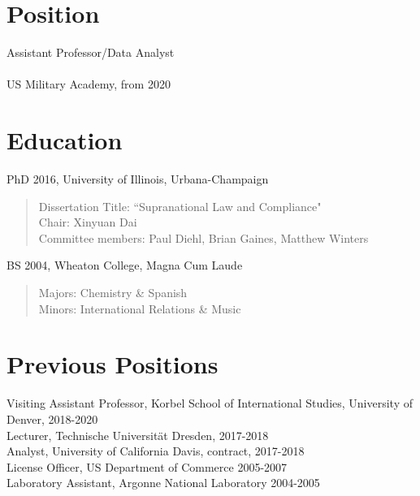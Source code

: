 \documentclass[margin, 10pt]{CVStyleTemplate}\usepackage[]{graphicx}\usepackage[]{color}
\begin{document}
\begin{resume}

\section{Position}

Assistant Professor/Data Analyst \\
\\
US Military Academy, from 2020 \\


\section{Education}
PhD 2016, University of Illinois, Urbana-Champaign 
  \begin{quotation} \noindent
  Dissertation Title: ``Supranational Law and Compliance"\\
  Chair: Xinyuan Dai\\
  Committee members: Paul Diehl, Brian Gaines, Matthew Winters
  \end{quotation}
BS 2004, Wheaton College, Magna Cum Laude 
  \begin{quotation} \noindent
  Majors: Chemistry \& Spanish \\
  Minors: International Relations \& Music
  \end{quotation}
%


\section{Previous Positions}

Visiting Assistant Professor, Korbel School of International Studies, University of Denver,  2018-2020 \\
Lecturer, Technische Universit\"{a}t Dresden, 2017-2018 \\
Analyst, University of California Davis, contract, 2017-2018 \\
License Officer, US Department of Commerce 2005-2007 \\
Laboratory Assistant, Argonne National Laboratory 2004-2005 \\


\end{resume}
\end{document}
